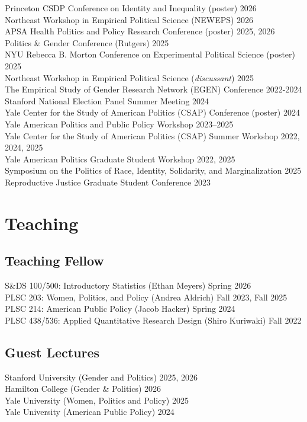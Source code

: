 \documentclass[11pt]{article}
\begin{document}
Princeton CSDP Conference on Identity and Inequality (poster) \hfill 2026 \\
Northeast Workshop in Empirical Political Science (NEWEPS)  \hfill 2026 \\
APSA Health Politics and Policy Research Conference (poster) \hfill 2025, 2026 \\
Politics \& Gender Conference (Rutgers) \hfill 2025 \\
NYU Rebecca B. Morton Conference on Experimental Political Science (poster) \hfill 2025 \\
Northeast Workshop in Empirical Political Science (\textit{discussant}) \hfill 2025 \\
The Empirical Study of Gender Research Network (EGEN) Conference \hfill 2022-2024 \\
Stanford National Election Panel Summer Meeting \hfill 2024 \\
Yale Center for the Study of American Politics (CSAP) Conference (poster) \hfill 2024 \\
Yale American Politics and Public Policy Workshop \hfill 2023–2025 \\
Yale Center for the Study of American Politics (CSAP) Summer Workshop \hfill 2022, 2024, 2025 \\
Yale American Politics Graduate Student Workshop \hfill 2022, 2025 \\ 
Symposium on the Politics of Race, Identity, Solidarity, and Marginalization \hfill 2025 \\
Reproductive Justice Graduate Student Conference \hfill 2023
 

\section*{Teaching}

\subsection*{Teaching Fellow} 
S\&DS 100/500: Introductory Statistics (Ethan Meyers) \hfill Spring 2026 \\
PLSC 203: Women, Politics, and Policy (Andrea Aldrich) \hfill Fall 2023, Fall 2025 \\
PLSC 214: American Public Policy (Jacob Hacker) \hfill Spring 2024 \\
PLSC 438/536: Applied Quantitative Research Design (Shiro Kuriwaki) \hfill Fall 2022 

\subsection*{Guest Lectures} 
Stanford University (Gender and Politics) \hfill 2025, 2026 \\
Hamilton College (Gender \& Politics) \hfill 2026 \\
Yale University (Women, Politics and Policy) \hfill 2025 \\ 
Yale University (American Public Policy) \hfill 2024 \\
\end{document}
